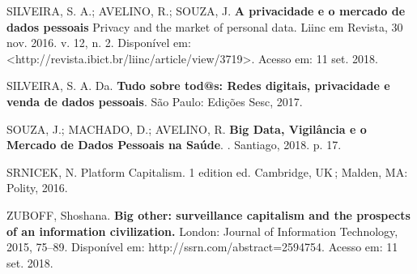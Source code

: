SILVEIRA, S. A.; AVELINO, R.; SOUZA, J. \textbf{A privacidade e o
mercado de dados pessoais} \textbar{} Privacy and the market of personal
data. Liinc em Revista, 30 nov. 2016. v. 12, n. 2. Disponível em:
\textless{}http://revista.ibict.br/liinc/article/view/3719\textgreater{}.
Acesso em: 11 set. 2018.

SILVEIRA, S. A. Da. \textbf{Tudo sobre tod@s: Redes digitais,
privacidade e venda de dados pessoais}. São Paulo: Edições Sesc, 2017.

SOUZA, J.; MACHADO, D.; AVELINO, R. \textbf{Big Data, Vigilância e o
Mercado de Dados Pessoais na Saúde}. . Santiago, 2018. p. 17.

SRNICEK, N. Platform Capitalism. 1 edition ed. Cambridge, UK\,; Malden,
MA: Polity, 2016.

ZUBOFF, Shoshana. \textbf{Big other: surveillance capitalism and the
prospects of an information civilization.} London: Journal of
Information Technology, 2015, 75--89. Disponível em:
http://ssrn.com/abstract=2594754. Acesso em: 11 set. 2018.

